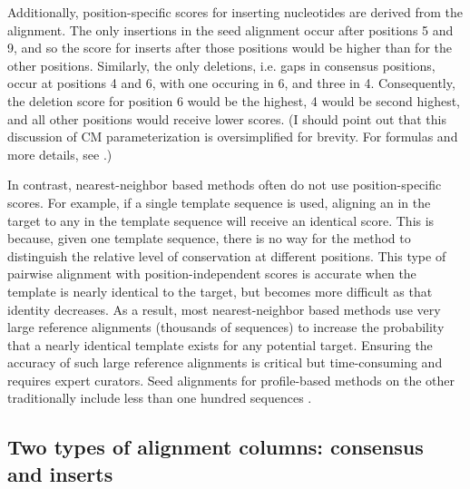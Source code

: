 Additionally, position-specific scores for inserting nucleotides are
derived from the alignment. The only insertions in the seed alignment
occur after positions 5 and 9, and so the score for inserts after
those positions would be higher than for the other
positions. Similarly, the only deletions, i.e. gaps in consensus
positions, occur at positions 4 and 6, with one occuring in 6, and
three in 4. Consequently, the deletion score for position 6 would be
the highest, 4 would be second highest, and all other
positions would receive lower scores. 
(I should point out that this discussion of CM parameterization is
oversimplified for brevity. For formulas and more details, see
\cite{Eddy94,Durbin98,Nawrocki09}.)

In contrast, nearest-neighbor based methods often do not use
position-specific scores. For example, if a single template sequence
is used,  aligning an  in the target to any  in the
template sequence will receive an identical score. This is because, given
one template sequence, there is no way for the method to distinguish
the relative level of conservation at different positions.
This type of pairwise alignment with position-independent scores is
accurate when the template is nearly identical to the target, but
becomes more difficult as that identity decreases. As a result, most
nearest-neighbor based methods use very large reference alignments
(thousands of sequences) to increase the probability that a nearly
identical template exists for any potential target. Ensuring the
accuracy of such large reference alignments is critical 
but time-consuming and requires expert curators. 
Seed alignments for profile-based methods on the other
traditionally include less than one hundred sequences
\cite{Finn10,Gardner09}.

\subsection{Two types of alignment columns: consensus and inserts}
\label{sec:background-columns}

